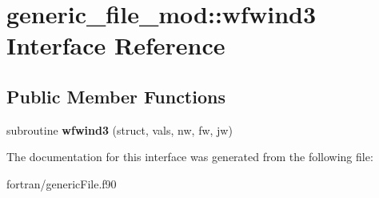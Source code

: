 \hypertarget{interfacegeneric__file__mod_1_1wfwind3}{}\section{generic\+\_\+file\+\_\+mod\+:\+:wfwind3 Interface Reference}
\label{interfacegeneric__file__mod_1_1wfwind3}
\subsection*{Public Member Functions}
\begin{DoxyCompactItemize}
\item 
\mbox{\label{interfacegeneric__file__mod_1_1wfwind3_ab27b949b28db4944efbe770e65fabd8f}} 
subroutine {\bfseries wfwind3} (struct, vals, nw, fw, jw)
\end{DoxyCompactItemize}


The documentation for this interface was generated from the following file\+:\begin{DoxyCompactItemize}
\item 
fortran/generic\+File.\+f90\end{DoxyCompactItemize}
